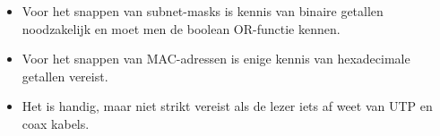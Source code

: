 
\begin{itemize}
\item Voor het snappen van subnet-masks is kennis van binaire getallen noodzakelijk en moet men de boolean OR-functie kennen.
\item Voor het snappen van MAC-adressen is enige kennis van hexadecimale getallen vereist.
\item Het is handig, maar niet strikt vereist als de lezer iets af weet van UTP en coax kabels.
\end{itemize}

